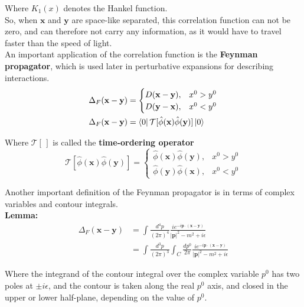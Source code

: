 \noindent Where $K_1(x)$ denotes the Hankel function. \\

\noindent So, when $\textbf{x}$ and $\textbf{y}$ are space-like separated, this correlation function can not be zero, and can therefore not carry any information, as it would have to travel faster than the speed of light. \\

\noindent An important application of the correlation function is the \textbf{Feynman propagator}, which is used later in perturbative expansions for describing interactions.
\begin{align}
    \Delta_F (\textbf{x} - \textbf{y}) &=
    \begin{cases}
      D(\textbf{x} - \textbf{y}), & x^0 > y^0 \\
      D(\textbf{y} - \textbf{x}), & x^0 < y^0
    \end{cases} \\
\Delta_F (\textbf{x} - \textbf{y}) &= \bra{0} \mathcal{T} [ \hat{\phi}(\textbf{x}) \hat{\phi}(\textbf{y}) ] \ket{0}
\end{align}

\noindent Where $\mathcal{T[\,]}$ is called the \textbf{time-ordering operator}
\begin{equation}
\mathcal{T} [ \hat{\phi}(\textbf{x}) \hat{\phi}(\textbf{y}) ] =
    \begin{cases}
      \hat{\phi}(\textbf{x}) \hat{\phi}(\textbf{y}), & x^0 > y^0 \\
      \hat{\phi}(\textbf{y}) \hat{\phi}(\textbf{x}), & x^0 < y^0
    \end{cases}
\end{equation}

\noindent Another important definition of the Feynman propagator is in terms of complex variables and contour integrals. \\

\noindent \textbf{Lemma:} 
\begin{align}
\Delta_F (\textbf{x} - \textbf{y}) &= \int \frac{d^4 p}{(2\pi)^4} \frac{i e^{-i \textbf{p} \cdot (\textbf{x}-\textbf{y})}}{|\textbf{p}|^2 - m^2 +i \epsilon} \\
&= \int \frac{d^3 p}{(2\pi)^3} \int_C \frac{d p^0}{2\pi} \frac{i e^{-i \textbf{p} \cdot (\textbf{x}-\textbf{y})}}{|\textbf{p}|^2 - m^2 +i \epsilon}
\end{align}

\noindent Where the integrand of the contour integral over the complex variable $p^0$ has two poles at $\pm i\epsilon$, and the contour is taken along the real $p^0$ axis, and closed in the upper or lower half-plane, depending on the value of $p^0$. \\

